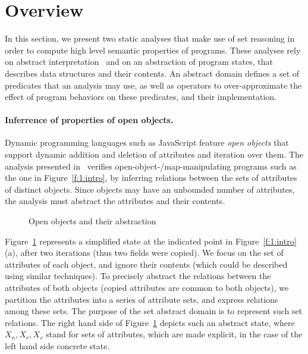 \section{Overview}
\label{s:2:over}
In this section, we present two static analyses that make use of set
reasoning in order to compute high level semantic properties of
programs.
These analyses rely on abstract interpretation~\cite{cc:popl:77} and
on an abstraction of program states, that describes data structures
and their contents.
An abstract domain defines a set of predicates that an analysis may
use, as well as operators to over-approximate the effect of program
behaviors on these predicates, and their implementation.

\paragraph{Inferrence of properties of open objects.}
Dynamic programming languages such as JavaScript feature {\em open objects}
that support dynamic addition and deletion of attributes and iteration over
them.
The analysis presented in~\cite{hoo:14:sas} verifies
open-object-/map-manipulating programs such as the one
in Figure~\ref{f:1:intro}, by
inferring relations between the sets of attributes
of distinct objects.
Since objects may have an unbounded number of attributes, the analysis must 
abstract the attributes and their contents.
\newcommand{\varsrc}{\cvar{src}}
\newcommand{\vardst}{\cvar{dst}}
\begin{figure}[t]
  \newcommand{\picscale}{0.82}
  \centering
    \tikzpics{\picscale}{hoo-inv}
  \caption{Open objects and their abstraction}
  \label{f:2:hoo}
\end{figure}
Figure~\ref{f:2:hoo} represents a simplified state at the indicated
point in Figure~\ref{f:1:intro}(a),
after two iterations (thus two fields were copied).
We focus on the set of attributes of each object, and ignore their
contents (which could be described using similar techniques).
To precisely abstract the relations between the attributes of both objects
(\eg copied attributes are common to both objects), we partition the
attributes into a series of attribute sets,
and express relations among these sets.
The purpose of the set abstract domain is to represent such set
relations.
The right hand side of Figure~\ref{f:2:hoo} depicts such an abstract
state, where \( X_n, X_r, X_v \) stand for sets of attributes, which are
made explicit, in the case of the left hand side concrete state.


